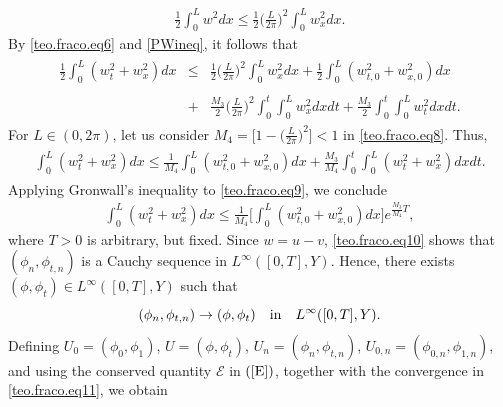 \documentclass[12pt,reqno,a4paper]{amsart} %
\numberwithin{equation}{section}
\numberwithin{figure}{section}
\begin{document}
\begin{align}  \label{PWineq}
	\frac{1}{2}\int_0^Lw^2dx\leq 	\frac{1}{2}\biggl(\frac{L}{2\pi}\biggl)^2\int_0^Lw_x^2dx.
\end{align} By \eqref{teo.fraco.eq6} and \eqref{PWineq}, it follows that
\begin{align} \label{teo.fraco.eq8}
	\begin{array}{lllll}
		\displaystyle	\frac{1}{2} \int_0^L(w_t^2+w_x^2)dx&\leq &\displaystyle \frac{1}{2}\biggl(\frac{L}{2\pi}\biggl)^2\int_0^Lw_x^2dx +	\frac{1}{2} 	\displaystyle\int_0^L(w_{t,0}^2+w_{x,0}^2)dx \\\\
		&+&\displaystyle	\frac{M_3}{2}\biggl(\frac{L}{2\pi}\biggl)^2 \int_0^t \int_0^Lw_x^2dxdt+	\frac{M_3}{2}\int_0^t\int_0^Lw_t^2 dxdt. 
	\end{array}
\end{align}For $L\in (0,2\pi)$, let us consider $M_4=\displaystyle \biggl[ 1-\biggl(\frac{L}{2\pi}\biggl)^2\biggl]<1$ %
 in \eqref{teo.fraco.eq8}. Thus, 
\begin{align} \label{teo.fraco.eq9}	\begin{array}{lllll}
	 	\displaystyle\int_0^L(w_t^2+w_x^2)dx\leq\displaystyle  	\frac{1}{M_4} 	\displaystyle\int_0^L(w_{t,0}^2+w_{x,0}^2)dx +\displaystyle	\frac{M_3}{M_4} \int_0^t \int_0^L(w_t^2+w_x^2)dxdt . 
	\end{array}
\end{align}Applying Gronwall's inequality to \eqref{teo.fraco.eq9}, we conclude
\begin{align} \label{teo.fraco.eq10}\displaystyle\int_0^L(w_t^2+w_x^2)dx\leq\frac{1}{M_4} 	\displaystyle\biggl[\int_0^L(w_{t,0}^2+w_{x,0}^2)dx\biggl] e^{\frac{M_3}{M_4}T},
\end{align} where $T>0$ is arbitrary, but fixed. Since $w=u-v$, \eqref{teo.fraco.eq10} shows that $	(\phi_n, \phi_{t,n})$ is a Cauchy sequence in $L^\infty([0,T],Y)$. 
Hence, there exists $(\phi, \phi_t) \in L^\infty([0,T],Y)$ such that 
\begin{equation}  \label{teo.fraco.eq11}
	(\phi_n, \phi_{t,n})\rightarrow (\phi, \phi_t) \quad {\rm{in}} \quad L^\infty([0,T],Y).  
\end{equation}
\indent Defining $U_0=(\phi_0,\phi_1)$, $U=(\phi, \phi_{t})$, $U_{n}=(\phi_n, \phi_{t,n})$, $U_{0,n}=(\phi_{0,n}, \phi_{1,n})$, and using the conserved quantity $\mathcal{E}$ in $(\ref{E})$, together with the convergence in \eqref{teo.fraco.eq11}, we obtain
\end{document}
